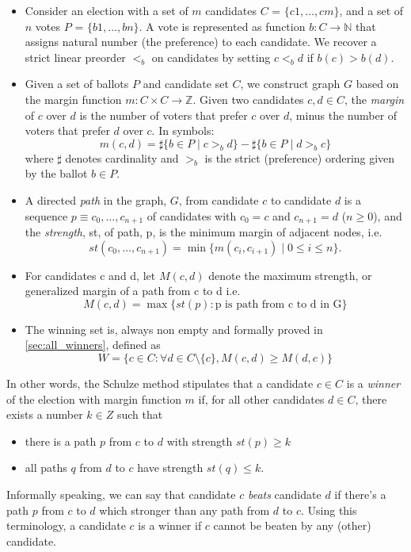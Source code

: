 \begin{itemize}

\item Consider an election with a set of $m$ candidates
 $C$ = $\{c1,\dots,cm\}$, and 
	a set of $n$ votes $P$ = $\{b1,\dots,bn\}$. A vote
	is represented as function $b: C \rightarrow \mathbb{N}$ that 
	assigns natural 
	number (the preference) to each candidate. We recover a strict linear  
	preorder $<_b$ on candidates by setting $c <_b d$ if $b(c) > b(d)$. 
	
\item Given a set of ballots $P$ and candidate set $C$, we construct graph $G$ based on the margin function $m: C \times C \to \mathbb{Z}$. Given two candidates $c, d \in C$,
the \emph{margin} of $c$ over $d$ is
the number of voters that prefer $c$ over $d$, minus the number of voters that prefer $d$ over $c$. 
In symbols:
\[
  m(c, d) = \sharp \lbrace b \in P \mid c >_b d \rbrace -
            \sharp \lbrace b \in P \mid d >_b c \rbrace
\] where $\sharp$ denotes cardinality and $>_b$ is the strict
(preference) ordering given by the ballot $b \in P$.





\item A directed \emph{path} in the graph, $G$, from
candidate $c$ to candidate $d$ is a sequence $p \equiv c_0, \dots, c_{n+1}$
of candidates with $c_0 = c$ and $c_{n+1} = d$ ($n \geq 0$), and the
\emph{strength}, st, of path, p, is the minimum margin of adjacent
nodes, i.e.
\[ st(c_0, \dots, c_{n+1}) = \min \lbrace m (c_i, c_{i+1}) \mid 0
\leq i \leq n \rbrace. \]
\item For candidates c and d, let $M(c, d)$ denote the maximum strength, or generalized margin of a path
	from c to d i.e. 
	\[ M(c, d) = \max \lbrace st (p) : \text{p is path from c to d in G} \rbrace\]
	
\item The winning set is, always non empty and  formally proved in \ref{sec:all_winners}, defined as 
 \[ W =  \lbrace c \in C : \forall d \in C \setminus \{c\}, M (c, d) \geq M (d, c) \rbrace\]

\end{itemize}

In other words, the Schulze method
stipulates that a candidate $c \in C$ is a \emph{winner} of the
election with margin function $m$ if, for all other candidates $d \in
C$, there exists a number $k \in Z$ such that
\begin{itemize}
\item there is a path $p$ from $c$ to $d$ with strength $st(p) \geq k$
\item all paths $q$ from $d$ to $c$ have strength $st(q) \leq k$.
\end{itemize}
Informally speaking, we can say that  candidate $c$
\emph{beats} candidate $d$ if there's a path $p$ from
$c$ to $d$ which stronger than any path from $d$ to $c$. Using
this terminology, a candidate $c$ is a winner if $c$ cannot be
beaten by any (other) candidate.


